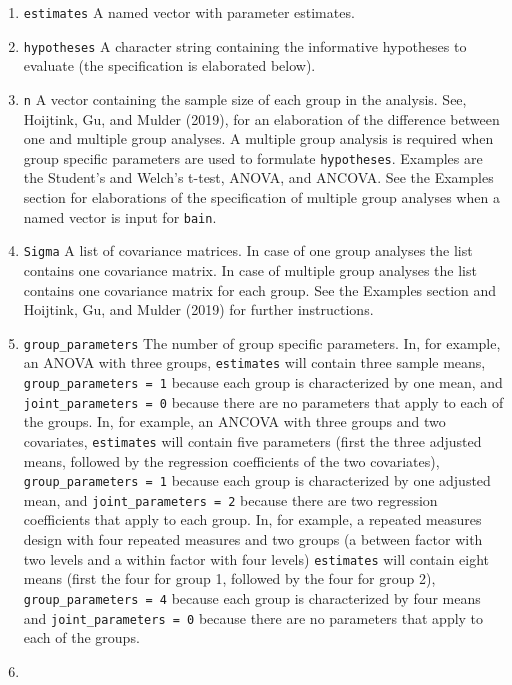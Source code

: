\documentclass[
]{book}
\providecommand{\tightlist}{%
  \setlength{\itemsep}{0pt}\setlength{\parskip}{0pt}}
\begin{document}
\begin{enumerate}
\def\labelenumi{\alph{enumi})}
\tightlist
\item
  \texttt{estimates} A named vector with parameter estimates.
\item
  \texttt{hypotheses} A character string containing the informative
  hypotheses to evaluate (the specification is elaborated below).
\item
  \texttt{n} A vector containing the sample size of each group in the
  analysis. See, Hoijtink, Gu, and Mulder (2019), for an elaboration of the
  difference between one and multiple group analyses. A multiple group
  analysis is required when group specific parameters are used to formulate
  \texttt{hypotheses}. Examples are the Student's and Welch's t-test, ANOVA, and
  ANCOVA. See the Examples section for elaborations of the specification of
  multiple group analyses when a named vector is input for \texttt{bain}.
\item
  \texttt{Sigma} A list of covariance matrices. In case of one group
  analyses the list contains one covariance matrix. In case of multiple group
  analyses the list contains one covariance matrix for each group. See the
  Examples section and Hoijtink, Gu, and Mulder (2019) for further instructions.
\item
  \texttt{group\_parameters} The number of group specific parameters. In,
  for example, an ANOVA with three groups, \texttt{estimates} will contain three
  sample means, \texttt{group\_parameters\ =\ 1} because each group is characterized
  by one mean, and \texttt{joint\_parameters\ =\ 0} because there are no parameters
  that apply to each of the groups. In, for example, an ANCOVA with three
  groups and two covariates, \texttt{estimates} will contain five parameters
  (first the three adjusted means, followed by the regression coefficients
  of the two covariates),
  \texttt{group\_parameters\ =\ 1} because each group is characterized by one
  adjusted mean, and \texttt{joint\_parameters\ =\ 2} because there are two
  regression coefficients that apply to each group. In, for example, a repeated
  measures design with four repeated measures and two groups (a between factor
  with two levels and a within factor with four levels) \texttt{estimates} will
  contain eight means (first the four for group 1, followed by the four
  for group 2), \texttt{group\_parameters\ =\ 4}
  because each group is characterized by four means and \texttt{joint\_parameters\ =\ 0} because there are no parameters that apply to each of the groups.
\item

\end{enumerate}
\end{document}
